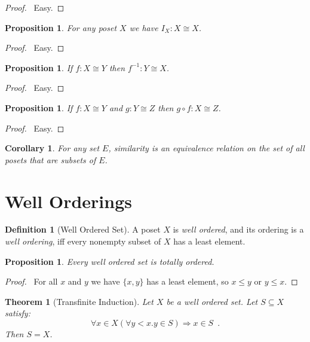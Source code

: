 \documentclass{report}
\let\qed\relax
\newtheorem{prop}[ax]{Proposition}
\newtheorem{cor}{Corollary}[ax]
\newtheorem{thm}[ax]{Theorem}
\theoremstyle{definition}
\newtheorem{df}[ax]{Definition}
\begin{document}
\begin{proof}
\pf\ Easy. \qed
\end{proof}

\begin{prop}
For any poset $X$ we have $I_X : X \cong X$.
\end{prop}

\begin{proof}
\pf\ Easy. \qed
\end{proof}

\begin{prop}
If $f : X \cong Y$ then $f^{-1} : Y \cong X$.
\end{prop}

\begin{proof}
\pf\ Easy. \qed
\end{proof}

\begin{prop}
If $f : X \cong Y$ and $g : Y \cong Z$ then $g \circ f : X \cong Z$.
\end{prop}

\begin{proof}
\pf\ Easy. \qed
\end{proof}

\begin{cor}
For any set $E$, similarity is an equivalence relation on the set of all posets that are subsets of $E$.
\end{cor}

\section{Well Orderings}

\begin{df}[Well Ordered Set]
A poset $X$ is \emph{well ordered}, and its ordering is a \emph{well ordering}, iff every nonempty subset of $X$ has a least element.
\end{df}

\begin{prop}
Every well ordered set is totally ordered.
\end{prop}

\begin{proof}
\pf\ For all $x$ and $y$ we have $\{x,y\}$ has a least element, so $x \leq y$ or $y \leq x$. \qed
\end{proof}

\begin{thm}[Transfinite Induction]
Let $X$ be a well ordered set. Let $S \subseteq X$ satisfy:
\[ \forall x \in X (\forall y < x. y \in S) \Rightarrow x \in S \enspace . \]
Then $S = X$.
\end{thm}
\end{document}
